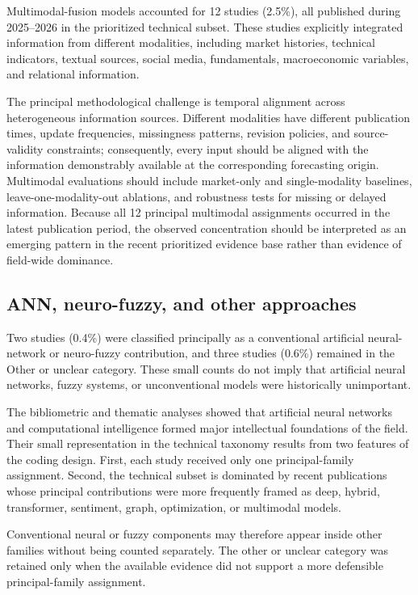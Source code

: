 \documentclass[12pt]{article}
\numberwithin{equation}{section}
\begin{document}
Multimodal-fusion models \cite{P00144,P00160,P00420,P00552,P00642,P00663,P01052,P01135,P01260,P01263} accounted for 12 studies (2.5\%), all published
during 2025--2026 in the prioritized technical subset. These studies
explicitly integrated information from different modalities, including
market histories, technical indicators, textual sources, social media,
fundamentals, macroeconomic variables, and relational information.

The principal methodological challenge is temporal alignment across
heterogeneous information sources. Different modalities have different
publication times, update frequencies, missingness patterns, revision
policies, and source-validity constraints; consequently, every input should
be aligned with the information demonstrably available at the corresponding
forecasting origin. Multimodal evaluations should include market-only and
single-modality baselines, leave-one-modality-out ablations, and robustness
tests for missing or delayed information. Because all 12 principal
multimodal assignments occurred in the latest publication period, the
observed concentration should be interpreted as an emerging pattern in the
recent prioritized evidence base rather than evidence of field-wide
dominance.


\subsection{ANN, neuro-fuzzy, and other approaches}
\label{sec:supp-other-models}

Two studies (0.4\%) \cite{P00841,P01112} were classified principally as a conventional artificial
neural-network or neuro-fuzzy contribution, and three studies (0.6\%)
remained in the Other or unclear category. These small counts do not imply that
artificial neural networks, fuzzy systems, or unconventional models
were historically unimportant.

The bibliometric and thematic analyses showed that artificial neural
networks and computational intelligence formed major intellectual
foundations of the field. Their small representation in the technical
taxonomy results from two features of the coding design. First, each
study received only one principal-family assignment. Second, the
technical subset is dominated by recent publications whose principal
contributions were more frequently framed as deep, hybrid,
transformer, sentiment, graph, optimization, or multimodal models.

Conventional neural or fuzzy components may therefore appear inside
other families without being counted separately. The other or unclear
category was retained only when the available evidence did not support
a more defensible principal-family assignment.
\end{document}
